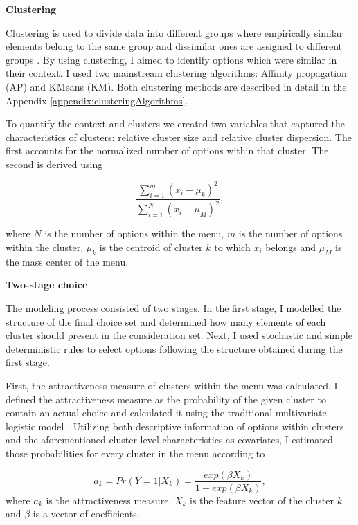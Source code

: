 \documentclass[a4paper,12pt]{article}
\begin{document}
\textbf{Clustering}

Clustering is used to divide data into different groups where empirically similar elements belong to the same group and dissimilar ones are assigned to different groups \citep{rokach2005clustering}. By using clustering, I aimed to identify options which were similar in their context. I used two mainstream clustering algorithms: Affinity propagation (AP) and KMeans (KM). Both clustering methods are described in detail in the Appendix \ref{appendix:clusteringAlgorithms}.

To quantify the context and clusters we created two variables that captured the characteristics of clusters: relative cluster size and relative cluster dispersion. The first accounts for the normalized number of options within that cluster. The second is derived using

$$\frac{\sum_{i=1}^{m}{({x_i -\mu_k})}^2}{{\sum_{i=1}^{N}{(x_i- \mu_M)}^2}} ,$$

where $N$ is the number of options within the menu, $m$ is the number of options within the cluster, $\mu_k$ is the centroid of cluster $k$ to which $x_i$ belongs and $\mu_M$ is the mass center of the menu.


\textbf{Two-stage choice}\label{hypergeometricDefinitionText}
 
The modeling process consisted of two stages. In the first stage, I modelled the structure of the final choice set and determined how many elements of each cluster should present in the consideration set. Next, I used stochastic and simple deterministic rules to select options following the structure obtained during the first stage.

First, the attractiveness measure of clusters within the menu was calculated. I defined the attractiveness measure as the probability of the given cluster to contain an actual choice and calculated it using the traditional multivariate logistic model \citep{ben1985discrete}. Utilizing both descriptive information of options within clusters and the aforementioned cluster level characteristics as covariates, I estimated those probabilities for every cluster in the menu according to

\begin{equation}\label{eq:multivariateLogit}
    a_k = Pr(Y=1|X_k)=\frac{exp(\beta  X_k)}{1 + exp(\beta X_k)},
\end{equation}
where $a_k$ is the attractiveness measure, $X_k$ is the feature vector of the cluster $k$ and $\beta$ is a vector of coefficients.
 
\end{document}
